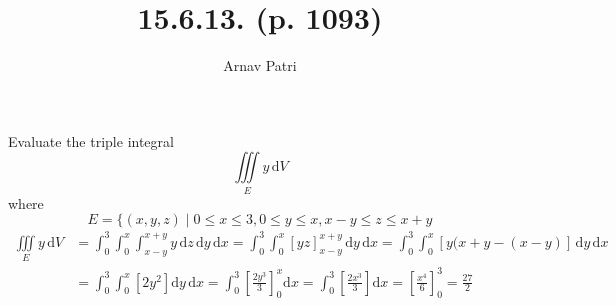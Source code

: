\documentclass[A4, 12pt]{article}
\title{15.6.13. (p. 1093)}
\author{Arnav Patri}
\renewcommand{\d}{\mathrm{d}}
\begin{document}
	\maketitle	
	\thispagestyle{empty}
	\flushleft
	Evaluate the triple integral
		\[\iiint\limits_E y\,\d V\]
		where
		\[E = \{(x, y, z) \mid 0 \le x \le 3, 0 \le y \le x, x - y \le z \le x + y\]
		\begin{align*}
			\iiint\limits_E y\,\d V &= \int_0^3\int_0^x\int_{x - y}^{x + y} y\,\d z\,\d y\,\d x
					= \int_0^3\int_0^x[yz]_{x - y}^{x + y}\,\d y\,\d x 
					= \int_0^3\int_0^x[y(x + y - (x - y)]\,\d y\,\d x \\
				&= \int_0^3\int_0^x\left[2y^2\right]\d y\,\d x
					= \int_0^3\left[\frac{2y^3}{3}\right]_0^x\d x
					= \int_0^3\left[\frac{2x^3}{3}\right]\d x
					= \left[\frac{x^4}{6}\right]_0^3 = \frac{27}{2}
		\end{align*}
\end{document}
